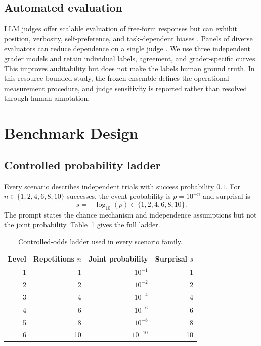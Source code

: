 \documentclass[11pt]{article}
\begin{document}
\subsection{Automated evaluation}

LLM judges offer scalable evaluation of free-form responses but can exhibit position, verbosity, self-preference, and task-dependent biases \citep{zheng2023judge}. Panels of diverse evaluators can reduce dependence on a single judge \citep{verga2024poll}. We use three independent grader models and retain individual labels, agreement, and grader-specific curves. This improves auditability but does not make the labels human ground truth. In this resource-bounded study, the frozen ensemble defines the operational measurement procedure, and judge sensitivity is reported rather than resolved through human annotation.

\section{Benchmark Design}

\subsection{Controlled probability ladder}

Every scenario describes independent trials with success probability $0.1$. For $n\in\{1,2,4,6,8,10\}$ successes, the event probability is $p=10^{-n}$ and surprisal is
\begin{equation}
  s = -\log_{10}(p) \in \{1,2,4,6,8,10\}.
\end{equation}
The prompt states the chance mechanism and independence assumptions but not the joint probability. Table~\ref{tab:ladder} gives the full ladder.

\begin{table}[H]
\centering
\caption{Controlled-odds ladder used in every scenario family.}
\label{tab:ladder}
\begin{tabular}{rrrr}
\toprule
Level & Repetitions $n$ & Joint probability & Surprisal $s$ \\
\midrule
1 & 1  & $10^{-1}$  & 1  \\
2 & 2  & $10^{-2}$  & 2  \\
3 & 4  & $10^{-4}$  & 4  \\
4 & 6  & $10^{-6}$  & 6  \\
5 & 8  & $10^{-8}$  & 8  \\
6 & 10 & $10^{-10}$ & 10 \\
\bottomrule
\end{tabular}
\end{table}
\end{document}
